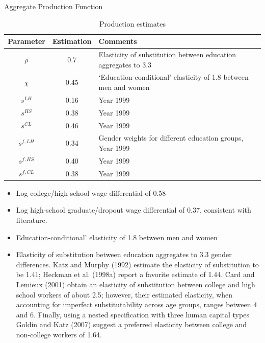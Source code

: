 \documentclass{beamer}
\begin{document}
\begin{frame}{Aggregate Production Function}

\begin{table}[H]
\caption {Production estimates} \label{tab:title} 
\begin{center}
 \begin{tabular}{ c | c | l }
  \hline
   Parameter & Estimation & Comments \\ \hline
   $\rho$ & 0.7 & \tiny{Elasticity of substitution between education aggregates to 3.3} \\ 
 $\chi$ & 0.45 & \tiny{‘Education-conditional’ elasticity of 1.8 between men and women} \\

            $s^{LH}$ & 0.16 & \tiny{Year 1999} \\
            $s^{HS}$ & 0.38 & \tiny{Year 1999}   \\
            $s^{CL}$ & 0.46 &  \tiny{Year 1999}  \\
 
            $s^{f,LH}$ & 0.34 &  \tiny{Gender weights for different education
groups, Year 1999}  \\
            $s^{f,HS}$ & 0.40 &  \tiny{Year 1999}  \\
            $s^{f,CL}$ & 0.38 &  \tiny{Year 1999}  \\
               

    \hline
  \end{tabular}
\end{center}
\end{table}

\begin{itemize}
\item Log college/high-school wage differential of 0.58 
\item Log high-school graduate/dropout wage differential of 0.37, consistent with literature.
\item Education-conditional’ elasticity of 1.8 between men and women
\item Elasticity of substitution between education aggregates to 3.3
gender differences. Katz and Murphy (1992) estimate the elasticity of substitution to be 1.41; Heckman et al. (1998a)
report a favorite estimate of 1.44. Card and Lemieux (2001) obtain an elasticity of substitution between college and high
school workers of about 2.5; however, their estimated elasticity, when accounting for imperfect substitutability across age
groups, ranges between 4 and 6. Finally, using a nested specification with three human capital types Goldin and Katz
(2007) suggest a preferred elasticity between college and non-college workers of 1.64.
\end{itemize}
    
\end{frame}
\end{document}
